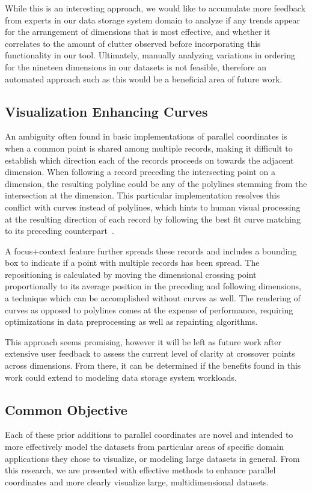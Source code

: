 \documentclass[journal]{vgtc}                %
\begin{document}
While this is an interesting approach, we would like to accumulate more feedback from experts in our data storage system domain to analyze if any trends appear for the arrangement of dimensions that is most effective, and whether it correlates to the amount of clutter observed before incorporating this functionality in our tool. Ultimately, manually analyzing variations in ordering for the nineteen dimensions in our datasets is not feasible, therefore an automated approach such as this would be a beneficial area of future work.

\subsection{Visualization Enhancing Curves}
\label{curves}
An ambiguity often found in basic implementations of parallel coordinates is when a common point is shared among multiple records, making it difficult to establish which direction each of the records proceeds on towards the adjacent dimension. When following a record preceding the intersecting point on a dimension, the resulting polyline could be any of the polylines stemming from the intersection at the dimension. This particular implementation resolves this conflict with curves instead of polylines, which hints to human visual processing at the resulting direction of each record by following the best fit curve matching to its preceding counterpart~\cite{Graham:2003:UCE}.

A focus+context feature further spreads these records and includes a bounding box to indicate if a point with multiple records has been spread. The repositioning is calculated by moving the dimensional crossing point proportionally to its average position in the preceding and following dimensions, a technique which can be accomplished without curves as well. The rendering of curves as opposed to polylines comes at the expense of performance, requiring optimizations in data preprocessing as well as repainting algorithms.

This approach seems promising, however it will be left as future work after extensive user feedback to assess the current level of clarity at crossover points across dimensions. From there, it can be determined if the benefits found in this work could extend to modeling data storage system workloads.

\subsection{Common Objective}
\label{common_objective}
Each of these prior additions to parallel coordinates are novel and intended to more effectively model the datasets from particular areas of specific domain applications they chose to visualize, or modeling large datasets in general. From this research, we are presented with effective methods to enhance parallel coordinates and more clearly visualize large, multidimensional datasets.
\end{document}
